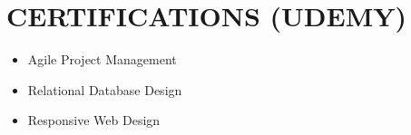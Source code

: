 \documentclass[letterpaper,11pt]{article}
\newcommand{\resumeItem}[1]{\item\small{{#1 \vspace{-3pt}}}}
\newcommand{\resumeItemListStart}{\begin{itemize}}
\newcommand{\resumeItemListEnd}{\end{itemize}\vspace{-5pt}}
\begin{document}
\section{{\fontsize{9pt}{20pt}\selectfont \textbf{CERTIFICATIONS (UDEMY)}}}
\resumeItemListStart
\resumeItem{Agile Project Management}
\vspace{-8pt}
\resumeItem{Relational Database Design}
\vspace{-8pt}
\resumeItem{Responsive Web Design}
\vspace{-8pt}
\resumeItemListEnd
\vspace{-8pt}
\end{document}
